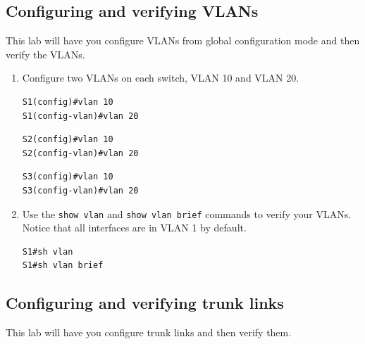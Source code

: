\subsection{Configuring and verifying VLANs}

This lab will have you configure VLANs from global configuration mode
and then verify the VLANs.

\begin{enumerate}
\item
  Configure two VLANs on each switch, VLAN 10 and VLAN 20.

\begin{verbatim}
S1(config)#vlan 10
S1(config-vlan)#vlan 20
\end{verbatim}

\begin{verbatim}
S2(config)#vlan 10
S2(config-vlan)#vlan 20
\end{verbatim}

\begin{verbatim}
S3(config)#vlan 10
S3(config-vlan)#vlan 20
\end{verbatim}
\item
  Use the \texttt{show\ vlan} and \texttt{show\ vlan\ brief} commands to
  verify your VLANs. Notice that all interfaces are in VLAN 1 by
  default.

\begin{verbatim}
S1#sh vlan
S1#sh vlan brief
\end{verbatim}
\end{enumerate}

\subsection{Configuring and verifying trunk links}

This lab will have you configure trunk links and then verify them.

